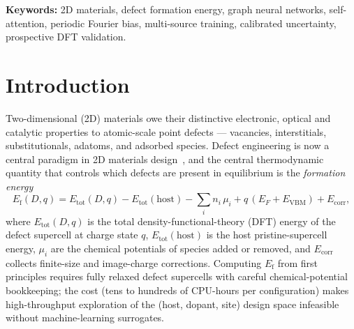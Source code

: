 \documentclass[11pt,a4paper]{article}
\begin{document}
\bigskip
\noindent\textbf{Keywords:} 2D materials, defect formation energy,
graph neural networks, self-attention, periodic Fourier bias,
multi-source training, calibrated uncertainty, prospective DFT
validation.

\section{Introduction}\label{sec:intro}

Two-dimensional (2D) materials owe their distinctive electronic,
optical and catalytic properties to atomic-scale point defects ---
vacancies, interstitials, substitutionals, adatoms, and adsorbed
species. Defect engineering is now a central paradigm in 2D materials
design~\cite{Hossen2024Defects, Schleberger2018Defect}, and the
central thermodynamic quantity that controls which defects are present
in equilibrium is the \emph{formation energy}
\begin{equation}
E_{\mathrm{f}}(D, q) = E_{\mathrm{tot}}(D, q) - E_{\mathrm{tot}}(\mathrm{host})
- \sum_i n_i\,\mu_i + q\,(E_F + E_{\mathrm{VBM}}) + E_{\mathrm{corr}},
\label{eq:Ef}
\end{equation}
where $E_{\mathrm{tot}}(D, q)$ is the total density-functional-theory
(DFT) energy of the defect supercell at charge state $q$,
$E_{\mathrm{tot}}(\mathrm{host})$ is the host pristine-supercell
energy, $\mu_i$ are the chemical potentials of species added or
removed, and $E_{\mathrm{corr}}$ collects finite-size and image-charge
corrections. Computing $E_{\mathrm{f}}$ from first principles requires
fully relaxed defect supercells with careful chemical-potential
bookkeeping; the cost (tens to hundreds of CPU-hours per
configuration) makes high-throughput exploration of the (host,
dopant, site) design space infeasible without machine-learning
surrogates.
\end{document}
